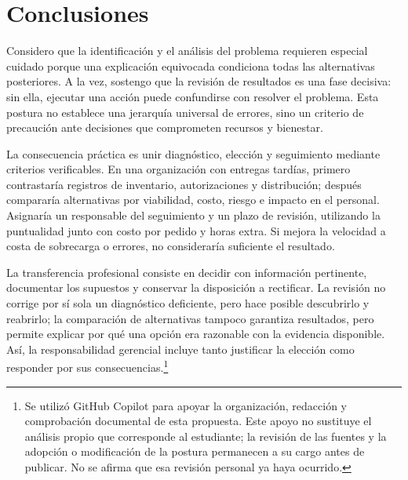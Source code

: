 \documentclass[11pt,letterpaper,oneside]{article}
\begin{document}
\clearpage
\section{Conclusiones}
Considero que la identificación y el análisis del problema requieren especial
cuidado porque una explicación equivocada condiciona todas las alternativas
posteriores. A la vez, sostengo que la revisión de resultados es una fase decisiva:
sin ella, ejecutar una acción puede confundirse con resolver el problema. Esta
postura no establece una jerarquía universal de errores, sino un criterio de
precaución ante decisiones que comprometen recursos y bienestar.

La consecuencia práctica es unir diagnóstico, elección y seguimiento mediante
criterios verificables. En una organización con entregas tardías, primero
contrastaría registros de inventario, autorizaciones y distribución; después
compararía alternativas por viabilidad, costo, riesgo e impacto en el personal.
Asignaría un responsable del seguimiento y un plazo de revisión, utilizando la
puntualidad junto con costo por pedido y horas extra. Si mejora la velocidad a
costa de sobrecarga o errores, no consideraría suficiente el resultado.

La transferencia profesional consiste en decidir con información pertinente,
documentar los supuestos y conservar la disposición a rectificar. La revisión
no corrige por sí sola un diagnóstico deficiente, pero hace posible descubrirlo
y reabrirlo; la comparación de alternativas tampoco garantiza resultados, pero
permite explicar por qué una opción era razonable con la evidencia disponible.
Así, la responsabilidad gerencial incluye tanto justificar la elección como
responder por sus consecuencias.\footnote{Se utilizó GitHub Copilot para apoyar la
organización, redacción y comprobación documental de esta propuesta. Este apoyo
no sustituye el análisis propio que corresponde al estudiante; la revisión de
las fuentes y la adopción o modificación de la postura permanecen a su cargo
antes de publicar. No se afirma que esa revisión personal ya haya ocurrido.}

\clearpage
\printbibliography[title={Referencias}]
\end{document}

